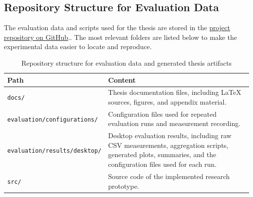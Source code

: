 \subsection{Repository Structure for Evaluation Data}
\label{appendix:repository-structure}

The evaluation data and scripts used for the thesis are stored in the \href{https://github.com/omeldar/baa-algorithmic-texture-synthesis}{project repository on GitHub}.. The most relevant folders are listed below to make the experimental data easier to locate and reproduce.

\begin{table}[H]
\centering
\caption{Repository structure for evaluation data and generated thesis artifacts}
\label{tab:repository_structure}
\begin{tabularx}{\textwidth}{|X|X|}
\hline
\textbf{Path} & \textbf{Content} \\
\hline
\hline
\texttt{docs/} & Thesis documentation files, including LaTeX sources, figures, and appendix material. \\
\hline
\texttt{evaluation/configurations/} & Configuration files used for repeated evaluation runs and measurement recording. \\
\hline
\texttt{evaluation/results/desktop/} & Desktop evaluation results, including raw CSV measurements, aggregation scripts, generated plots, summaries, and the configuration files used for each run. \\
\hline
\texttt{src/} & Source code of the implemented research prototype. \\
\hline
\end{tabularx}
\end{table}